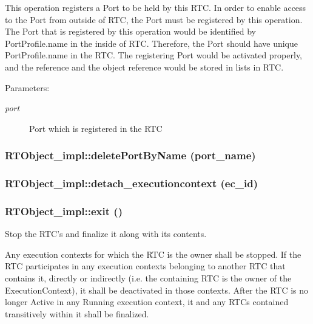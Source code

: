 This operation registers a Port to be held by this RTC. In order to enable access to the Port from outside of RTC, the Port must be registered by this operation. The Port that is registered by this operation would be identified by Port\-Profile.name in the inside of RTC. Therefore, the Port should have unique Port\-Profile.name in the RTC. The registering Port would be activated properly, and the reference and the object reference would be stored in lists in RTC. \begin{Desc}
\item[Parameters:]
\begin{description}
\item[{\em port}]Port which is registered in the RTC\end{description}
\end{Desc}
\subsubsection{\setlength{\rightskip}{0pt plus 5cm}RTObject\_\-impl::delete\-Port\-By\-Name (port\_\-name)}\label{classRTObject__impl_RTObject__impla66}


\subsubsection{\setlength{\rightskip}{0pt plus 5cm}RTObject\_\-impl::detach\_\-executioncontext (ec\_\-id)}\label{classRTObject__impl_RTObject__impla23}


\subsubsection{\setlength{\rightskip}{0pt plus 5cm}RTObject\_\-impl::exit ()}\label{classRTObject__impl_RTObject__impla15}


Stop the RTC's and finalize it along with its contents. 

Any execution contexts for which the RTC is the owner shall be stopped. If the RTC participates in any execution contexts belonging to another RTC that contains it, directly or indirectly (i.e. the containing RTC is the owner of the Execution\-Context), it shall be deactivated in those contexts. After the RTC is no longer Active in any Running execution context, it and any RTCs contained transitively within it shall be finalized.

